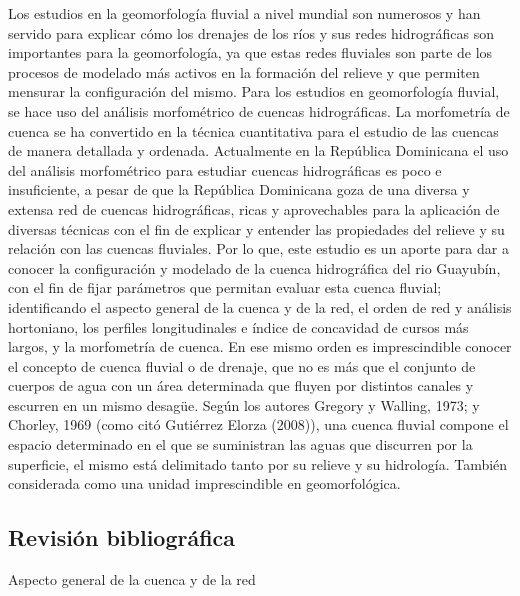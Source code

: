 \documentclass[11pt,]{article}
\begin{document}
Los estudios en la geomorfología fluvial a nivel mundial son numerosos y
han servido para explicar cómo los drenajes de los ríos y sus redes
hidrográficas son importantes para la geomorfología, ya que estas redes
fluviales son parte de los procesos de modelado más activos en la
formación del relieve y que permiten mensurar la configuración del
mismo. Para los estudios en geomorfología fluvial, se hace uso del
análisis morfométrico de cuencas hidrográficas. La morfometría de cuenca
se ha convertido en la técnica cuantitativa para el estudio de las
cuencas de manera detallada y ordenada. Actualmente en la República
Dominicana el uso del análisis morfométrico para estudiar cuencas
hidrográficas es poco e insuficiente, a pesar de que la República
Dominicana goza de una diversa y extensa red de cuencas hidrográficas,
ricas y aprovechables para la aplicación de diversas técnicas con el fin
de explicar y entender las propiedades del relieve y su relación con las
cuencas fluviales. Por lo que, este estudio es un aporte para dar a
conocer la configuración y modelado de la cuenca hidrográfica del rio
Guayubín, con el fin de fijar parámetros que permitan evaluar esta
cuenca fluvial; identificando el aspecto general de la cuenca y de la
red, el orden de red y análisis hortoniano, los perfiles longitudinales
e índice de concavidad de cursos más largos, y la morfometría de cuenca.
En ese mismo orden es imprescindible conocer el concepto de cuenca
fluvial o de drenaje, que no es más que el conjunto de cuerpos de agua
con un área determinada que fluyen por distintos canales y escurren en
un mismo desagüe. Según los autores Gregory y Walling, 1973; y Chorley,
1969 (como citó Gutiérrez Elorza (2008)), una cuenca fluvial compone el
espacio determinado en el que se suministran las aguas que discurren por
la superficie, el mismo está delimitado tanto por su relieve y su
hidrología. También considerada como una unidad imprescindible en
geomorfológica.

\subsection{Revisión bibliográfica}\label{revisiuxf3n-bibliogruxe1fica}

Aspecto general de la cuenca y de la red
\end{document}
